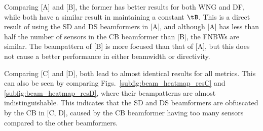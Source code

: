 Comparing [A] and [B], the former has better results for both WNG and DF, while both have a similar result in maintaining a constant $\tB$. This is a direct result of using the SD and DS beamformers in [A], and although [A] has less than half the number of sensors in the CB beamformer than [B], the FNBWs are  similar. The beampattern of [B] is more focused than that of [A], but this does not cause a better performance in either beamwidth or directivity.

Comparing [C] and [D], both lead to almost identical results for all metrics. This can also be seen by comparing Figs.~\ref{subfig:beam_heatmap_resC} and \ref{subfig:beam_heatmap_resD}, where their beampatterns are almost indistinguishable. This indicates that the SD and DS beamformers are obfuscated by the CB in [C, D], caused by the CB beamformer having too many sensors compared to the other beamformers.